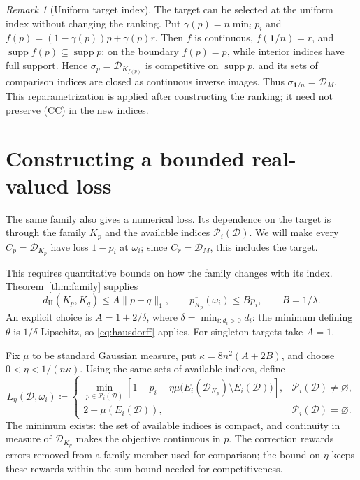 \documentclass[11pt]{article}
\theoremstyle{remark}
\newtheorem{remark}[theorem]{Remark}
\newcommand{\one}{\mathbf 1}
\newcommand{\supp}{\operatorname{supp}}
\newcommand{\dH}{d_{\mathrm H}}
\newcommand{\Dscr}{\mathcal D}
\newcommand{\upprob}[1]{\overline{p_{#1}}}
\begin{document}
\begin{remark}[Uniform target index]
The target can be selected at the uniform index without changing the ranking.
Put $\gamma(p)=n\min_i p_i$ and $f(p)=(1-\gamma(p))p+\gamma(p)r$.
Then $f$ is continuous, $f(\one/n)=r$, and
$\supp f(p)\subseteq\supp p$: on the boundary $f(p)=p$, while interior
indices have full support. Hence $\sigma_p=\Dscr_{K_{f(p)}}$ is competitive on
$\supp p$, and its sets of comparison indices are closed as continuous inverse
images. Thus $\sigma_{\one/n}=\Dscr_{M}$. This reparametrization is applied after
constructing the ranking; it need not preserve (CC) in the new indices.
\end{remark}

\section{Constructing a bounded real-valued loss}

The same family also gives a numerical loss. Its dependence on the target is
through the family $K_p$ and the available indices $\mathcal P_i(\Dscr)$.
We will make every $C_p=\Dscr_{K_p}$ have loss $1-p_i$ at $\omega_i$;
since $C_r=\Dscr_M$, this includes the target.

This requires quantitative bounds on how the family changes with its index.
Theorem~\ref{thm:family} supplies
\[
 \dH(K_p,K_q)\le A\|p-q\|_1,\qquad \upprob{K_p}(\omega_i)\le Bp_i,
 \qquad B=1/\lambda.
\]
An explicit choice is $A=1+2/\delta$, where $\delta=\min_{i:d_i>0}d_i$:
the minimum defining $\theta$ is $1/\delta$-Lipschitz, so
\eqref{eq:hausdorff} applies. For singleton targets take $A=1$.

Fix $\mu$ to be standard Gaussian measure, put $\kappa=8n^2(A+2B)$, and choose
$0<\eta<1/(n\kappa)$. Using the same sets of available indices, define
\begin{equation}
 L_\eta(\Dscr,\omega_i)\coloneqq
 \begin{cases}
 \displaystyle\min_{p\in\mathcal P_i(\Dscr)}
 \left[1-p_i-\eta\mu\big(E_i(\Dscr_{K_p})\setminus E_i(\Dscr)\big)\right],
       &\mathcal P_i(\Dscr)\ne\varnothing,\\[3pt]
 2+\mu(E_i(\Dscr)),&\mathcal P_i(\Dscr)=\varnothing.
 \end{cases}\label{eq:finite-loss}
\end{equation}
The minimum exists: the set of available indices is compact, and continuity in measure of
$\Dscr_{K_p}$ makes the objective continuous in $p$. The correction rewards errors removed from a family member used for comparison; the bound on $\eta$ keeps these rewards within the sum bound needed for competitiveness.
\end{document}
